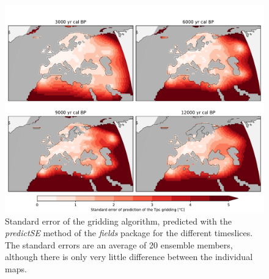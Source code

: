 \begin{refsection}
\begin{subappendices}
		\begin{figure}[h]
			\includegraphics[width=\linewidth]{gridding-figures/ensemble-tps-se.pdf}
			\caption[Standard error of the Tps gridding method]{Standard error of the gridding algorithm, predicted with the \textit{predictSE} method of the \textit{fields} package \citep{NychkaFurrerPaigeEtAl2017} for the different timeslices. The standard errors are an average of 20 ensemble members, although there is only very little difference between the individual maps.}
			\label{fig:gridding-tps-se}
		\end{figure}

\end{subappendices}

\clearpage

\printbibliography[heading=subbibintoc]

\end{refsection}